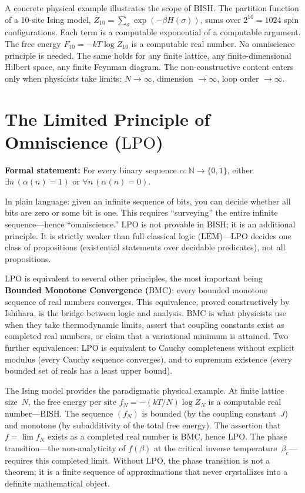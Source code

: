 \documentclass[11pt,a4paper]{report}
\theoremstyle{plain}
\theoremstyle{definition}
\theoremstyle{remark}
\newcommand{\BISH}{\mathrm{BISH}}
\newcommand{\LPO}{\mathrm{LPO}}
\newcommand{\BMC}{\mathrm{BMC}}
\newcommand{\LEM}{\mathrm{LEM}}
\newcommand{\NN}{\mathbb{N}}
\begin{document}
A concrete physical example illustrates the scope of $\BISH$. The partition function of a 10-site Ising model, $Z_{10} = \sum_\sigma \exp(-\beta H(\sigma))$, sums over $2^{10} = 1024$ spin configurations. Each term is a computable exponential of a computable argument. The free energy $F_{10} = -kT \log Z_{10}$ is a computable real number. No omniscience principle is needed. The same holds for any finite lattice, any finite-dimensional Hilbert space, any finite Feynman diagram. The non-constructive content enters only when physicists take limits: $N \to \infty$, dimension $\to \infty$, loop order $\to \infty$.

\section{The Limited Principle of Omniscience ($\LPO$)}

\textbf{Formal statement:} For every binary sequence $\alpha : \NN \to \{0,1\}$, either $\exists n\, (\alpha(n)=1)$ or $\forall n\, (\alpha(n)=0)$.

In plain language: given an infinite sequence of bits, you can decide whether all bits are zero or some bit is one. This requires ``surveying'' the entire infinite sequence---hence ``omniscience.'' $\LPO$ is not provable in $\BISH$; it is an additional principle. It is strictly weaker than full classical logic ($\LEM$)---$\LPO$ decides one class of propositions (existential statements over decidable predicates), not all propositions.

$\LPO$ is equivalent to several other principles, the most important being \textbf{Bounded Monotone Convergence ($\BMC$)}: every bounded monotone sequence of real numbers converges. This equivalence, proved constructively by Ishihara, is the bridge between logic and analysis. $\BMC$ is what physicists use when they take thermodynamic limits, assert that coupling constants exist as completed real numbers, or claim that a variational minimum is attained. Two further equivalences: $\LPO$ is equivalent to Cauchy completeness without explicit modulus (every Cauchy sequence converges), and to supremum existence (every bounded set of reals has a least upper bound).

The Ising model provides the paradigmatic physical example. At finite lattice size~$N$, the free energy per site $f_N = -(kT/N)\log Z_N$ is a computable real number---$\BISH$. The sequence $(f_N)$ is bounded (by the coupling constant~$J$) and monotone (by subadditivity of the total free energy). The assertion that $f = \lim f_N$ exists as a completed real number is $\BMC$, hence $\LPO$. The phase transition---the non-analyticity of $f(\beta)$ at the critical inverse temperature~$\beta_c$---requires this completed limit. Without $\LPO$, the phase transition is not a theorem; it is a finite sequence of approximations that never crystallizes into a definite mathematical object.
\end{document}
